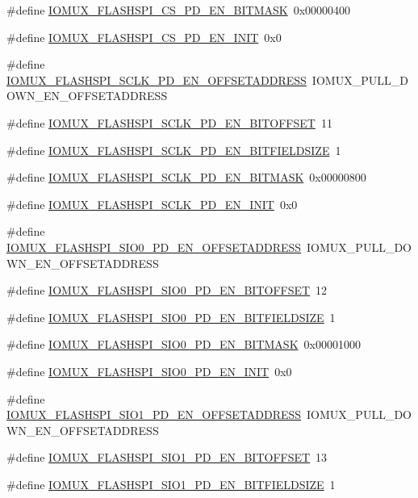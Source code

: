 \begin{DoxyCompactItemize}
\item 
\#define \hyperlink{a00560_a5c2d99faa3258534adb0ccbae2a97d49}{IOMUX\_\-FLASHSPI\_\-CS\_\-PD\_\-EN\_\-BITMASK}~0x00000400
\item 
\#define \hyperlink{a00560_a9b4727a386d1fd4e24526e93b8565fe2}{IOMUX\_\-FLASHSPI\_\-CS\_\-PD\_\-EN\_\-INIT}~0x0
\item 
\#define \hyperlink{a00560_ad620433123147654b51f5a8c6da1a79e}{IOMUX\_\-FLASHSPI\_\-SCLK\_\-PD\_\-EN\_\-OFFSETADDRESS}~IOMUX\_\-PULL\_\-DOWN\_\-EN\_\-OFFSETADDRESS
\item 
\#define \hyperlink{a00560_a78669daaba92a36a31a187d689ad90a8}{IOMUX\_\-FLASHSPI\_\-SCLK\_\-PD\_\-EN\_\-BITOFFSET}~11
\item 
\#define \hyperlink{a00560_a36e932bbf40a3e98c4c1c1bff5f4ae79}{IOMUX\_\-FLASHSPI\_\-SCLK\_\-PD\_\-EN\_\-BITFIELDSIZE}~1
\item 
\#define \hyperlink{a00560_abece1d0a6a1fa715a1dbeaf843ba9774}{IOMUX\_\-FLASHSPI\_\-SCLK\_\-PD\_\-EN\_\-BITMASK}~0x00000800
\item 
\#define \hyperlink{a00560_a7b2acd32044b621130e45e4cd50d0436}{IOMUX\_\-FLASHSPI\_\-SCLK\_\-PD\_\-EN\_\-INIT}~0x0
\item 
\#define \hyperlink{a00560_ae64509f490b22ad81b157e7d2b3c7cc2}{IOMUX\_\-FLASHSPI\_\-SIO0\_\-PD\_\-EN\_\-OFFSETADDRESS}~IOMUX\_\-PULL\_\-DOWN\_\-EN\_\-OFFSETADDRESS
\item 
\#define \hyperlink{a00560_a1981d1569e1cd29cb5a05af3711dec3f}{IOMUX\_\-FLASHSPI\_\-SIO0\_\-PD\_\-EN\_\-BITOFFSET}~12
\item 
\#define \hyperlink{a00560_aac89cf45b7396967672bded0ea51b09e}{IOMUX\_\-FLASHSPI\_\-SIO0\_\-PD\_\-EN\_\-BITFIELDSIZE}~1
\item 
\#define \hyperlink{a00560_a75324b198d4c5e90276b0476990c2047}{IOMUX\_\-FLASHSPI\_\-SIO0\_\-PD\_\-EN\_\-BITMASK}~0x00001000
\item 
\#define \hyperlink{a00560_a68024066a920b16a6301a7c3048d7260}{IOMUX\_\-FLASHSPI\_\-SIO0\_\-PD\_\-EN\_\-INIT}~0x0
\item 
\#define \hyperlink{a00560_ac6ee644214712e0865d302a3856bdd52}{IOMUX\_\-FLASHSPI\_\-SIO1\_\-PD\_\-EN\_\-OFFSETADDRESS}~IOMUX\_\-PULL\_\-DOWN\_\-EN\_\-OFFSETADDRESS
\item 
\#define \hyperlink{a00560_a753da743984fc95a87cc3a8931e1179d}{IOMUX\_\-FLASHSPI\_\-SIO1\_\-PD\_\-EN\_\-BITOFFSET}~13
\item 
\#define \hyperlink{a00560_a1fd94caef89f89e3c634ed5a8f8dbbfb}{IOMUX\_\-FLASHSPI\_\-SIO1\_\-PD\_\-EN\_\-BITFIELDSIZE}~1

\end{DoxyCompactItemize}
